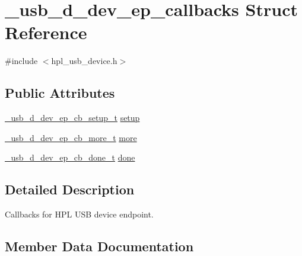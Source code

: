 \hypertarget{struct__usb__d__dev__ep__callbacks}{}\section{\+\_\+usb\+\_\+d\+\_\+dev\+\_\+ep\+\_\+callbacks Struct Reference}
\label{struct__usb__d__dev__ep__callbacks}


{\ttfamily \#include $<$hpl\+\_\+usb\+\_\+device.\+h$>$}

\subsection*{Public Attributes}
\begin{DoxyCompactItemize}
\item 
\hyperlink{hpl__usb__device_8h_a81bbff71ce31abdbe92373eed18b1b92}{\+\_\+usb\+\_\+d\+\_\+dev\+\_\+ep\+\_\+cb\+\_\+setup\+\_\+t} \hyperlink{struct__usb__d__dev__ep__callbacks_adbbe0ff2f92220167cc1aab7585e1abc}{setup}
\item 
\hyperlink{hpl__usb__device_8h_a659f0292117e58db11a03eda4c363fcb}{\+\_\+usb\+\_\+d\+\_\+dev\+\_\+ep\+\_\+cb\+\_\+more\+\_\+t} \hyperlink{struct__usb__d__dev__ep__callbacks_afec5f7edef6aba004bb3950d733c028f}{more}
\item 
\hyperlink{hpl__usb__device_8h_a60aa954de0dd8fc6dfd175699d8d7165}{\+\_\+usb\+\_\+d\+\_\+dev\+\_\+ep\+\_\+cb\+\_\+done\+\_\+t} \hyperlink{struct__usb__d__dev__ep__callbacks_a9cbcdf7ef8ac49d9ad775d87bb3858ca}{done}
\end{DoxyCompactItemize}


\subsection{Detailed Description}
Callbacks for H\+PL U\+SB device endpoint. 

\subsection{Member Data Documentation}
\mbox{\label{struct__usb__d__dev__ep__callbacks_a9cbcdf7ef8ac49d9ad775d87bb3858ca}} 
